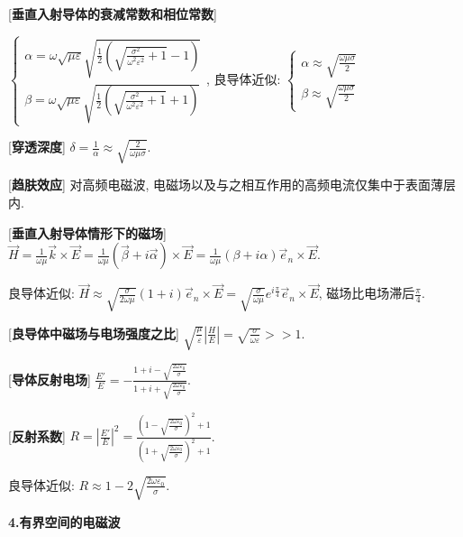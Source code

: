 [\textbf{垂直入射导体的衰减常数和相位常数}]\par
\qquad $\begin{cases}\alpha=\omega\sqrt{\mu\varepsilon}\sqrt{\frac{1}{2}\left(\sqrt{\frac{\sigma^2}{\omega^2\varepsilon^2}+1}-1\right)}\\\beta=\omega\sqrt{\mu\varepsilon}\sqrt{\frac{1}{2}\left(\sqrt{\frac{\sigma^2}{\omega^2\varepsilon^2}+1}+1\right)}\end{cases}$, 良导体近似: $\begin{cases}\alpha\approx \sqrt{\frac{\omega\mu\sigma}{2}}\\\beta\approx\sqrt{\frac{\omega\mu\sigma}{2}}\end{cases}$\par

[\textbf{穿透深度}] $\delta=\frac{1}{\alpha}\approx \sqrt{\frac{2}{\omega\mu\sigma}}$.\par

[\textbf{趋肤效应}] 对高频电磁波, 电磁场以及与之相互作用的高频电流仅集中于表面薄层内.\par

[\textbf{垂直入射导体情形下的磁场}] $\vec H=\frac{1}{\omega\mu}\vec k\times\vec E=\frac{1}{\omega\mu}(\vec\beta+i\vec\alpha)\times\vec E=\frac{1}{\omega\mu}(\beta+i\alpha)\vec e_n\times\vec E$.\par
\qquad 良导体近似: $\vec H\approx \sqrt{\frac{\sigma}{2\omega\mu}}(1+i)\vec e_n\times\vec E=\sqrt{\frac{\sigma}{\omega\mu}}e^{i\frac{\pi}{4}}\vec e_n\times\vec E$, 磁场比电场滞后$\frac{\pi}{4}$.\par

[\textbf{良导体中磁场与电场强度之比}] $\sqrt{\frac{\mu}{\varepsilon}}\left|\frac{H}{E}\right|=\sqrt{\frac{\sigma}{\omega\varepsilon}}>>1$.\par

[\textbf{导体反射电场}] $\frac{E'}{E}=-\frac{1+i-\sqrt{\frac{2\omega\varepsilon_0}{\sigma}}}{1+i+\sqrt{\frac{2\omega\varepsilon_0}{\sigma}}}$.\par

[\textbf{反射系数}] $R=\left|\frac{E'}{E}\right|^2=\frac{\left(1-\sqrt{\frac{2\omega\varepsilon_0}{\sigma}}\right)^2+1}{\left(1+\sqrt{\frac{2\omega\varepsilon_0}{\sigma}}\right)^2+1}$.\par
\qquad 良导体近似: $R\approx 1-2\sqrt{\frac{2\omega\varepsilon_0}{\sigma}}$.\par

\clearpage

\large 
\begin{center}
 \textbf{4.有界空间的电磁波}
\end{center}

